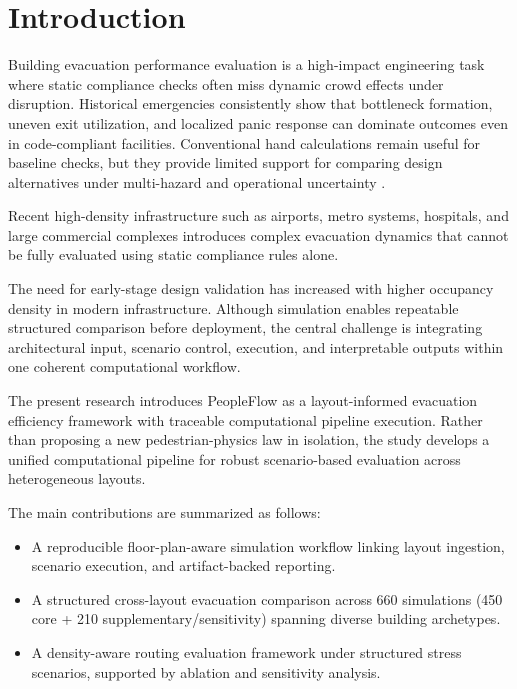 \documentclass[utf8]{FrontiersinHarvard}
\begin{document}
\section{Introduction}

Building evacuation performance evaluation is a high-impact engineering task where static compliance checks often miss dynamic crowd effects under disruption. Historical emergencies consistently show that bottleneck formation, uneven exit utilization, and localized panic response can dominate outcomes even in code-compliant facilities. Conventional hand calculations remain useful for baseline checks, but they provide limited support for comparing design alternatives under multi-hazard and operational uncertainty \cite{sfpe,evac_review}.

Recent high-density infrastructure such as airports, metro systems, hospitals, and large commercial complexes introduces complex evacuation dynamics that cannot be fully evaluated using static compliance rules alone.

The need for early-stage design validation has increased with higher occupancy density in modern infrastructure. Although simulation enables repeatable structured comparison before deployment, the central challenge is integrating architectural input, scenario control, execution, and interpretable outputs within one coherent computational workflow.

The present research introduces PeopleFlow as a layout-informed evacuation efficiency framework with traceable computational pipeline execution. Rather than proposing a new pedestrian-physics law in isolation, the study develops a unified computational pipeline for robust scenario-based evaluation across heterogeneous layouts.

The main contributions are summarized as follows:
\begin{itemize}
    \item A reproducible floor-plan-aware simulation workflow linking layout ingestion, scenario execution, and artifact-backed reporting.
    \item A structured cross-layout evacuation comparison across 660 simulations (450 core + 210 supplementary/sensitivity) spanning diverse building archetypes.
    \item A density-aware routing evaluation framework under structured stress scenarios, supported by ablation and sensitivity analysis.
\end{itemize}
\end{document}
